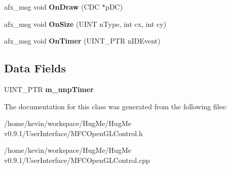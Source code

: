 \begin{DoxyCompactItemize}
\item 
\hypertarget{classMFCOpenGLControl_a8956e55122f375bb9bbe4f1ad55f3470}{
afx\_\-msg void {\bfseries OnDraw} (CDC $\ast$pDC)}
\label{classMFCOpenGLControl_a8956e55122f375bb9bbe4f1ad55f3470}

\item 
\hypertarget{classMFCOpenGLControl_a6b585bc2fa6380208b8e9af5d91ceddf}{
afx\_\-msg void {\bfseries OnSize} (UINT nType, int cx, int cy)}
\label{classMFCOpenGLControl_a6b585bc2fa6380208b8e9af5d91ceddf}

\item 
\hypertarget{classMFCOpenGLControl_ace04284c25e46ca408a05cf4f2a9ccd4}{
afx\_\-msg void {\bfseries OnTimer} (UINT\_\-PTR nIDEvent)}
\label{classMFCOpenGLControl_ace04284c25e46ca408a05cf4f2a9ccd4}

\end{DoxyCompactItemize}
\subsection*{Data Fields}
\begin{DoxyCompactItemize}
\item 
\hypertarget{classMFCOpenGLControl_a3c140c9546324bc1547a7a309ad71aed}{
UINT\_\-PTR {\bfseries m\_\-unpTimer}}
\label{classMFCOpenGLControl_a3c140c9546324bc1547a7a309ad71aed}

\end{DoxyCompactItemize}


The documentation for this class was generated from the following files:\begin{DoxyCompactItemize}
\item 
/home/kevin/workspace/HugMe/HugMe v0.9.1/UserInterface/MFCOpenGLControl.h\item 
/home/kevin/workspace/HugMe/HugMe v0.9.1/UserInterface/MFCOpenGLControl.cpp\end{DoxyCompactItemize}
